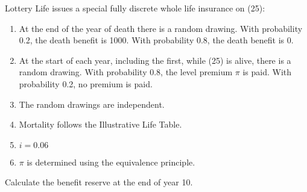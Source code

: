 Lottery Life issues a special fully discrete whole life insurance on (25):
\begin{enumerate}
\item At the end of the year of death there is a random drawing. With probability 0.2,
the death benefit is 1000. With probability 0.8, the death benefit is 0.
\item At the start of each year, including the first, while (25) is alive, there is a random
drawing. With probability 0.8, the level premium $\pi$ is paid. With probability
0.2, no premium is paid.
\item  The random drawings are independent.
\item Mortality follows the Illustrative Life Table.
\item $i = 0.06$
\item $\pi$ is determined using the equivalence principle.
\end{enumerate}
Calculate the benefit reserve at the end of year 10.
